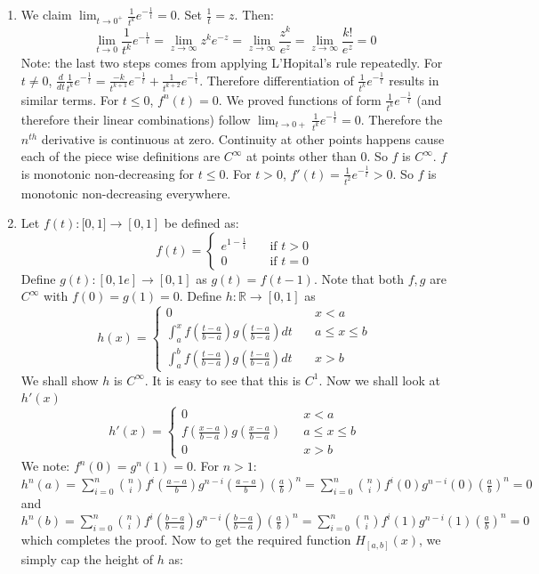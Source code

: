 \documentclass[oneside]{book}\twocolumn
\begin{document}
\begin{enumerate}
    \item We claim $\lim_{t\to0^+}\frac{1}{t^k}e^{-\frac{1}{t}}=0$. Set $\frac{1}{t}=z$. Then:
    $$\lim_{t\to0}\frac{1}{t^k}e^{-\frac{1}{t}}=\lim_{z\to\infty}z^ke^{-z}=\lim_{z\to\infty}\frac{z^k}{e^z}=\lim_{z\to\infty}\frac{k!}{e^z}=0$$
    Note: the last two steps comes from applying L'Hopital's rule repeatedly. For $t\ne 0$, $\frac{d}{dt}\frac{1}{t^k}e^{-\frac{1}{t}}=\frac{-k}{t^{k+1}}e^{-\frac{1}{t}}+\frac{1}{t^{k+2}}e^{-\frac{1}{t}}$. Therefore differentiation of $\frac{1}{t^k}e^{-\frac{1}{t}}$ results in similar terms. For $t\leq 0$, $f^n(t)=0$. We proved functions of form $\frac{1}{t^k}e^{-\frac{1}{t}}$
    (and therefore their linear combinations) follow $\lim_{t\to 0+}\frac{1}{t^k}e^{-\frac{1}{t}}=0$. Therefore the $n^{th}$ derivative  is continuous at zero. Continuity at other points happens cause each of the piece wise definitions are $C^\infty$ at points other than 0. So $f$ is $C^\infty$. $f$ is monotonic non-decreasing for $t\leq 0$. For $t>0$, $f'(t)=\frac{1}{t^2}e^{-\frac{1}{t}}>0$. So $f$ is monotonic non-decreasing everywhere.
    \item Let $f(t):\mathbb [0,1]\to [0,1]$ be defined as:
    $$f(t)=\begin{cases}e^{1-\frac{1}{t}}\quad&\text{if }t>0\\0\quad&\text{if }t=0\end{cases}$$
    Define $g(t):[0,1e]\to[0,1]$ as $g(t)=f(t-1)$. Note that both $f,g$ are $C^\infty$ with $f(0)=g(1)=0$. Define $h:\mathbb R\to[0,1]$ as $$h(x)=\begin{cases}
    0\quad&x<a\\\int_{a}^{x}f\left(\frac{t-a}{b-a}\right)g\left(\frac{t-a}{b-a}\right)dt\quad&a\leq x\leq b\\\int_{a}^{b}f\left(\frac{t-a}{b-a}\right)g\left(\frac{t-a}{b-a}\right)dt\quad&x>b\end{cases}$$
    We shall show $h$ is $C^\infty$. It is easy to see that this is $C^1$. Now we shall look at $h'(x)$
    $$h'(x)=\begin{cases}0\quad&x<a\\f\left(\frac{x-a}{b-a}\right)g\left(\frac{x-a}{b-a}\right)\quad&a\leq x\leq b\\0\quad&x>b \end{cases}$$
    We note: $f^n(0)=g^n(1)=0$. For $n>1$:  $h^n(a)=\sum_{i=0}^n{n\choose i}f^i\left(\frac{a-a}{b}\right)g^{n-i}\left(\frac{a-a}{b}\right)\left(\frac{a}{b}\right)^n=\sum_{i=0}^n{n\choose i}f^i(0)g^{n-i}(0)\left(\frac{a}{b}\right)^n=0$ and $h^n(b)=\sum_{i=0}^n{n\choose i}f^i\left(\frac{b-a}{b-a}\right)g^{n-i}\left(\frac{b-a}{b-a}\right)\left(\frac{a}{b}\right)^n=\sum_{i=0}^n{n\choose i}f^i(1)g^{n-i}(1)\left(\frac{a}{b}\right)^n=0$ which completes the proof. Now to get the required function $H_{[a,b]}(x)$, we simply cap the height of $h$ as:

\end{enumerate}
\end{document}
